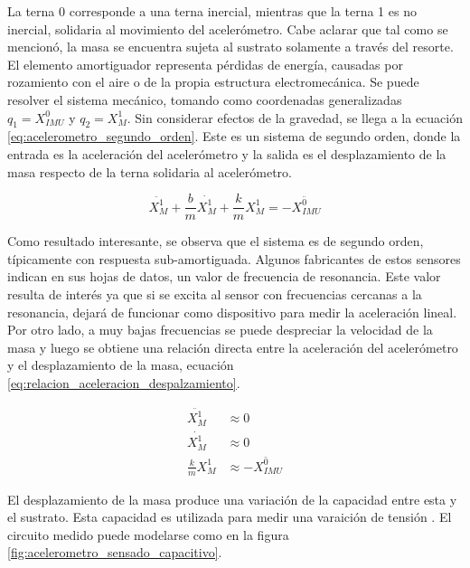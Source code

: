 La terna 0 corresponde a una terna inercial, mientras que la terna 1 es no inercial, solidaria al movimiento del acelerómetro. Cabe aclarar que tal como se mencionó, la masa se encuentra sujeta al sustrato solamente a través del resorte. El elemento amortiguador representa pérdidas de energía, causadas por rozamiento con el aire o de la propia estructura electromecánica. Se puede resolver el sistema mecánico, tomando como coordenadas generalizadas $q_1 = X_{IMU}^0$ y $q_2 = X_M^1$. Sin considerar efectos de la gravedad, se llega a la ecuación \eqref{eq:acelerometro_segundo_orden}. Este es un sistema de segundo orden, donde la entrada es la aceleración del acelerómetro y la salida es el desplazamiento de la masa respecto de la terna solidaria al acelerómetro. 

\begin{equation}
    \ddot{X_M^1} + \frac{b}{m} \dot{X_M^1} + \frac{k}{m} X_M^1 = -\ddot{X_{IMU}^0}
    \label{eq:acelerometro_segundo_orden}
\end{equation}

Como resultado interesante, se observa que el sistema es de segundo orden, típicamente con respuesta sub-amortiguada. Algunos fabricantes de estos sensores indican en sus hojas de datos, un valor de frecuencia de resonancia. Este valor resulta de interés ya que si se excita al sensor con frecuencias cercanas a la resonancia, dejará de funcionar como dispositivo para medir la aceleración lineal. Por otro lado, a muy bajas frecuencias se puede despreciar la velocidad de la masa y luego se obtiene una relación directa entre la aceleración del acelerómetro y el desplazamiento de la masa, ecuación \eqref{eq:relacion_aceleracion_despalzamiento}.

\begin{subequations}
	\begin{align}
        \ddot{X_M^1} &\approx 0\\
        \dot{X_M^1} &\approx 0\\
        \frac{k}{m} X_M^1 &\approx -\ddot{X_{IMU}^0}
	\end{align}
    \label{eq:relacion_aceleracion_despalzamiento}
\end{subequations}

El desplazamiento de la masa produce una variación de la capacidad entre esta y el sustrato. Esta capacidad es utilizada para medir una varaición de tensión \cite{zhang2010sensing}. El circuito medido puede modelarse como en la figura \ref{fig:acelerometro_sensado_capacitivo}.


